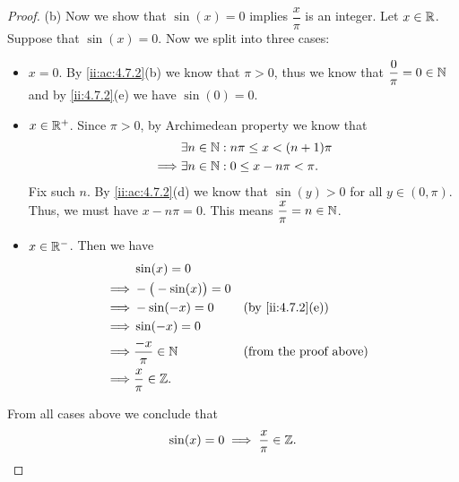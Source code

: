 \begin{proof}{(b)}
  Now we show that \(\sin(x) = 0\) implies \(\dfrac{x}{\pi}\) is an integer.
  Let \(x \in \mathbb{R}\).
  Suppose that \(\sin(x) = 0\).
  Now we split into three cases:
  \begin{itemize}
    \item \(x = 0\).
          By \cref{ii:ac:4.7.2}(b) we know that \(\pi > 0\), thus we know that \(\dfrac{0}{\pi} = 0 \in \mathbb{N}\) and by \cref{ii:4.7.2}(e) we have \(\sin(0) = 0\).
    \item \(x \in \mathbb{R}^+\).
          Since \(\pi > 0\), by Archimedean property we know that
          \begin{align*}
                     & \exists n \in \mathbb{N} : n \pi \leq x < (n + 1) \pi \\
            \implies & \exists n \in \mathbb{N} : 0 \leq x - n \pi < \pi.
          \end{align*}
          Fix such \(n\).
          By \cref{ii:ac:4.7.2}(d) we know that \(\sin(y) > 0\) for all \(y \in (0, \pi)\).
          Thus, we must have \(x - n \pi = 0\).
          This means \(\dfrac{x}{\pi} = n \in \mathbb{N}\).
    \item \(x \in \mathbb{R}^-\).
          Then we have
          \begin{align*}
                     & \sin(x) = 0                                                \\
            \implies & -\big(-\sin(x)\big) = 0                                    \\
            \implies & -\sin(-x) = 0           &  & \by{ii:4.7.2}[e]              \\
            \implies & \sin(-x) = 0                                               \\
            \implies & \dfrac{-x}{\pi} \in \N  &  & \text{(from the proof above)} \\
            \implies & \dfrac{x}{\pi} \in \Z.
          \end{align*}
  \end{itemize}
  From all cases above we conclude that
  \[
    \sin(x) = 0 \implies \dfrac{x}{\pi} \in \mathbb{Z}.
  \]
\end{proof}


